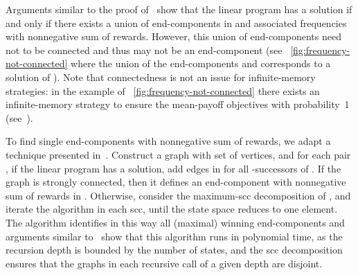 \documentclass{article}
\begin{document}
\smallskip{}
Arguments similar to the proof of~\cite[Theorem 2.2]{KS88} show that the linear
program  has a solution if and only if there exists a union of end-components in 
and associated frequencies with nonnegative sum of rewards. However, this union
of end-components need not to be connected and thus may not be an end-component
(see \figurename~\ref{fig:frequency-not-connected} where the union of 
the end-components  and  corresponds to a solution of ).
Note that connectedness is not an issue for infinite-memory strategies: 
in the example of \figurename~\ref{fig:frequency-not-connected} there exists 
an infinite-memory strategy to ensure the mean-payoff objectives with probability~1 
(see~\cite[Lemma~7]{VCDHRR15}).

\smallskip{}
To find single end-components with nonnegative sum of rewards, we adapt a 
technique presented in~\cite[Section~3]{KS88}. Construct a graph  with set  of vertices,
and for each pair , if the linear program  
has a solution, add edges  in  for all -successors  of .   If the graph  is strongly connected, then it defines an end-component with nonnegative
sum of rewards in . Otherwise, consider the maximum-scc decomposition of , 
and iterate the algorithm in each scc, until the state space reduces to one element. 
The algorithm identifies in this way all (maximal) winning end-components and
arguments similar to~\cite[Theorem~3.3]{KS88} show that this algorithm runs in polynomial
time, as the recursion depth is bounded by the number of states, and the scc 
decomposition ensures that the graphs in each recursive call of a given depth 
are disjoint.
\end{document}
